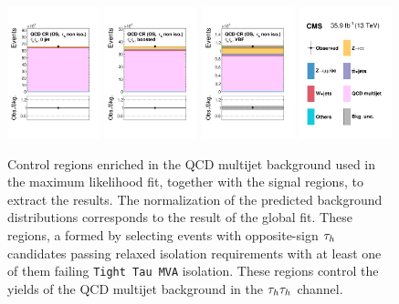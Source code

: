 \begin{figure}[!htbp]
\centering
     \includegraphics[width=0.24\textwidth]{higgs_to_taus/plots/Figure_004-a.pdf}
     \includegraphics[width=0.24\textwidth]{higgs_to_taus/plots/Figure_004-b.pdf}
     \includegraphics[width=0.24\textwidth]{higgs_to_taus/plots/Figure_004-c.pdf}
     \includegraphics[width=0.24\textwidth]{higgs_to_taus/plots/Figure_004-d.pdf}
     \caption{Control regions enriched in the QCD multijet background used in the maximum likelihood fit, 
together with the signal regions, to extract the results. The normalization of the predicted background 
distributions corresponds to the result of the global fit. These regions, a formed by selecting events with 
opposite-sign $\tau_{h}$ candidates passing relaxed isolation requirements with at least one of them
failing \texttt{Tight Tau MVA} isolation. These regions control the yields of the QCD multijet background 
in the $\tau_{h}\tau_{h}$ channel.}
     \label{fig:htt_qcd_CR4}
\end{figure}




